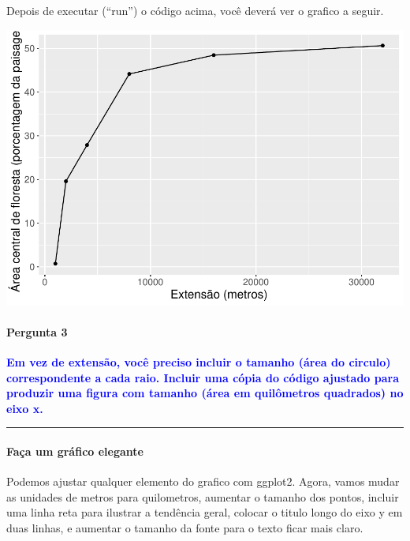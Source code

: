 \documentclass[
]{article}
\begin{document}
Depois de executar (``run'') o código acima, você deverá ver o grafico a seguir.

\begin{center}\includegraphics[width=0.5\linewidth,height=0.5\textheight]{epr_files/figure-latex/unnamed-chunk-40-1} \end{center}

\hypertarget{pergunta-3-1}{%
\paragraph{Pergunta 3}\label{pergunta-3-1}}

\textcolor{blue}{\textbf{Em vez de extensão, você preciso incluir o tamanho (área do circulo) correspondente a cada raio. Incluir uma cópia do código ajustado para produzir uma figura com tamanho (área em quilômetros quadrados) no eixo x.}}

\begin{center}\rule{0.5\linewidth}{0.5pt}\end{center}

\newpage

\hypertarget{fauxe7a-um-gruxe1fico-elegante}{%
\paragraph{Faça um gráfico elegante}\label{fauxe7a-um-gruxe1fico-elegante}}

Podemos ajustar qualquer elemento do grafico com ggplot2. Agora, vamos mudar as unidades de metros para quilometros, aumentar o tamanho dos pontos, incluir uma linha reta para ilustrar a tendência geral, colocar o titulo longo do eixo y em duas linhas, e aumentar o tamanho da fonte para o texto ficar mais claro.
\end{document}
